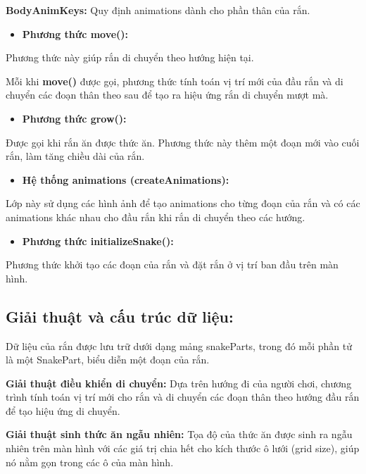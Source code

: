 \documentclass[a4paper, 12pt]{article}
\begin{document}
\textbf{BodyAnimKeys:} Quy định animations dành cho phần thân của rắn.

\begin{itemize}
    \item \textbf{Phương thức move():}
\end{itemize}

Phương thức này giúp rắn di chuyển theo hướng hiện tại.

Mỗi khi \textbf{move()} được gọi, phương thức tính toán vị trí mới của đầu rắn và di chuyển các đoạn thân theo sau để tạo ra hiệu ứng rắn di chuyển mượt mà.

\begin{itemize}
    \item \textbf{Phương thức grow():}
\end{itemize}

Được gọi khi rắn ăn được thức ăn. Phương thức này thêm một đoạn mới vào cuối rắn, làm tăng chiều dài của rắn.

\begin{itemize}
    \item \textbf{Hệ thống animations (createAnimations):}
\end{itemize}

Lớp này sử dụng các hình ảnh để tạo animations cho từng đoạn của rắn và có các animations khác nhau cho đầu rắn khi rắn di chuyển theo các hướng.

\begin{itemize}
    \item \textbf{Phương thức initializeSnake():}
\end{itemize}

Phương thức khởi tạo các đoạn của rắn và đặt rắn ở vị trí ban đầu trên màn hình.

\subsection{Giải thuật và cấu trúc dữ liệu:}

Dữ liệu của rắn được lưu trữ dưới dạng mảng snakeParts, trong đó mỗi phần tử là một SnakePart, biểu diễn một đoạn của rắn. 

\textbf{Giải thuật điều khiển di chuyển:} Dựa trên hướng đi của người chơi, chương trình tính toán vị trí mới cho rắn và di chuyển các đoạn thân theo hướng đầu rắn để tạo hiệu ứng di chuyển.

\textbf{Giải thuật sinh thức ăn ngẫu nhiên:} Tọa độ của thức ăn được sinh ra ngẫu nhiên trên màn hình với các giá trị chia hết cho kích thước ô lưới (grid size), giúp nó nằm gọn trong các ô của màn hình.
\end{document}
